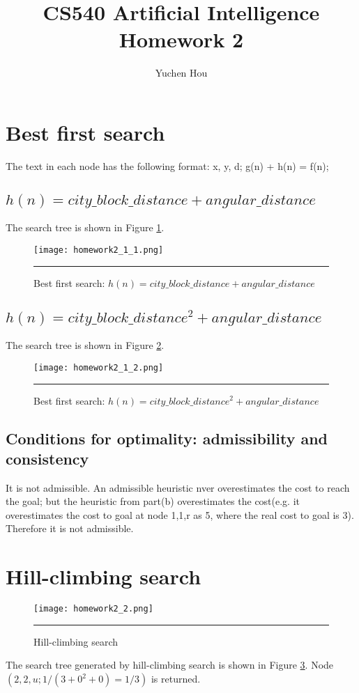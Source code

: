 \documentclass[12pt]{article}
\begin{document}
\title{CS540 Artificial Intelligence Homework 2}
\author{Yuchen Hou}
\maketitle

\section{Best first search}
The text in each node has the following format: x, y, d; g(n) + h(n) = f(n);
\subsection{$h(n)=city\_block\_distance+angular\_distance$}
The search tree is shown in Figure \ref{fig:bfs}.
\begin{figure}[htb]
  \centering
      {\texttt{[image: homework2\_1\_1.png]}} \rule{1\linewidth}{1pt}
      \caption{Best first search: $h(n)=city\_block\_distance+angular\_distance$}
      \label{fig:bfs}
\end{figure}
\subsection{$h(n)=city\_block\_distance^2+angular\_distance$}
The search tree is shown in Figure \ref{fig:bfs2}.
\begin{figure}[htb]
  \centering
      {\texttt{[image: homework2\_1\_2.png]}} \rule{1\linewidth}{1pt}
      \caption{Best first search: $h(n)=city\_block\_distance^2+angular\_distance$}
      \label{fig:bfs2}
\end{figure}
\subsection{Conditions for optimality: admissibility and consistency}
It is not admissible. An admissible heuristic nver overestimates the cost to reach the goal; but the heuristic from part(b) overestimates the cost(e.g. it overestimates the cost to goal at node 1,1,r as 5, where the real cost to goal is 3). Therefore it is not admissible.

\section{Hill-climbing search}
\begin{figure}[htb]
  \centering
      {\texttt{[image: homework2\_2.png]}} \rule{1\linewidth}{1pt}
      \caption{Hill-climbing search}
      \label{fig:hcs}
\end{figure}
The search tree generated by hill-climbing search is shown in Figure \ref{fig:hcs}. Node $(2,2,u; 1/(3+0^2+0)=1/3)$ is returned.
\end{document}
